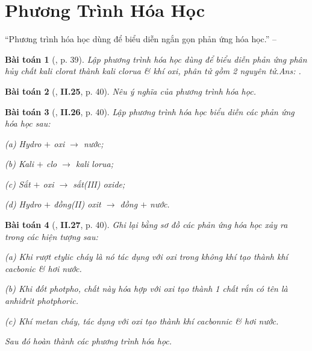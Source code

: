 \documentclass{article}
\numberwithin{equation}{section}
\newtheorem{baitoan}{Bài toán}
\begin{document}

\section{Phương Trình Hóa Học}
``Phương trình hóa học dùng để biểu diễn ngắn gọn phản ứng hóa học.'' -- \cite[p. 39]{Truong_BTNC_Hoa_Hoc_8_2022}

\begin{baitoan}[\cite{Truong_BTNC_Hoa_Hoc_8_2022}, p. 39]
	Lập phương trình hóa học dùng để biểu diễn phản ứng phân hủy chất kali clorat thành kali clorua \& khí oxi, phân tử gồm 2 nguyên tử.\hfill\textsf{Ans:} \emph{}.
\end{baitoan}

\begin{baitoan}[\cite{Truong_BTNC_Hoa_Hoc_8_2022}, \textbf{II.25}, p. 40]
	Nêu ý nghĩa của phương trình hóa học.
\end{baitoan}

\begin{baitoan}[\cite{Truong_BTNC_Hoa_Hoc_8_2022}, \textbf{II.26}, p. 40]
	Lập phương trình hóa học biểu diễn các phản ứng hóa học sau:
	\begin{enumerate*}
		\item[(a)] Hydro $+$ oxi $\to$ nước;
		\item[(b)] Kali $+$ clo $\to$ kali lorua;
		\item[(c)] Sắt $+$ oxi $\to$ sắt(III) oxide;
		\item[(d)] Hydro $+$ đồng(II) oxit $\to$ đồng $+$ nước.
	\end{enumerate*}
\end{baitoan}

\begin{baitoan}[\cite{Truong_BTNC_Hoa_Hoc_8_2022}, \textbf{II.27}, p. 40]
	Ghi lại bằng sơ đồ các phản ứng hóa học xảy ra trong các hiện tượng sau:
	\begin{enumerate*}
		\item[(a)] Khi rượt etylic cháy là nó tác dụng với oxi trong không khí tạo thành khí cacbonic \& hơi nước.
		\item[(b)] Khi đốt photpho, chất này hóa hợp với oxi tạo thành 1 chất rắn có tên là anhiđrit photphoric.
		\item[(c)] Khí metan \emph{} cháy, tác dụng với oxi tạo thành khí cacbonnic \& hơi nước.
	\end{enumerate*}
	Sau đó hoàn thành các phương trình hóa học.
\end{baitoan}
\end{document}
